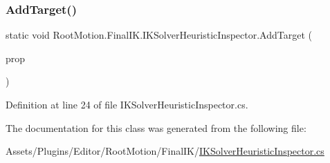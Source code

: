 \subsubsection{\texorpdfstring{Add\+Target()}{AddTarget()}}
{\footnotesize\ttfamily static void Root\+Motion.\+Final\+I\+K.\+I\+K\+Solver\+Heuristic\+Inspector.\+Add\+Target (\begin{DoxyParamCaption}\item[{Serialized\+Property}]{prop }\end{DoxyParamCaption})\hspace{0.3cm}{\ttfamily [static]}}



Definition at line 24 of file I\+K\+Solver\+Heuristic\+Inspector.\+cs.



The documentation for this class was generated from the following file\+:\begin{DoxyCompactItemize}
\item 
Assets/\+Plugins/\+Editor/\+Root\+Motion/\+Final\+I\+K/\mbox{\hyperlink{_i_k_solver_heuristic_inspector_8cs}{I\+K\+Solver\+Heuristic\+Inspector.\+cs}}\end{DoxyCompactItemize}
